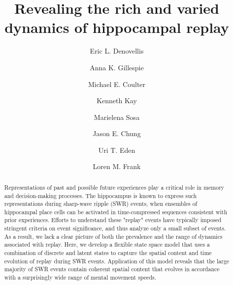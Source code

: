 \documentclass[times, twoside]{zHenriquesLab-StyleBioRxiv}
\begin{document}
\title{Revealing the rich and varied dynamics of hippocampal replay}

\author[1]{Eric L. Denovellis}
\author[2, 3]{Anna K. Gillespie}
\author[2, 3]{Michael E. Coulter}
\author[4]{Kenneth Kay}
\author[5]{Marielena Sosa}
\author[6]{Jason E. Chung}
\author[7]{Uri T. Eden}
\author[1, 2, 3, \Letter]{Loren M. Frank}




\maketitle

\begin{abstract}
Representations of past and possible future experiences play a critical role in memory and decision-making processes. The hippocampus is known to express such representations during sharp-wave ripple (SWR) events, when ensembles of hippocampal place cells can be activated in time-compressed sequences consistent with prior experiences. Efforts to understand these "replay" events have typically imposed stringent criteria on event significance, and thus analyze only a small subset of events.  As a result, we lack a clear picture of both the prevalence and the range of dynamics associated with replay. Here, we develop a flexible state space model that uses a combination of discrete and latent states to capture the spatial content and time evolution of replay during SWR events. Application of this model reveals that the large majority of SWR events contain coherent spatial content that evolves in accordance with a surprisingly wide range of mental movement speeds.

\end {abstract}
\end{document}
